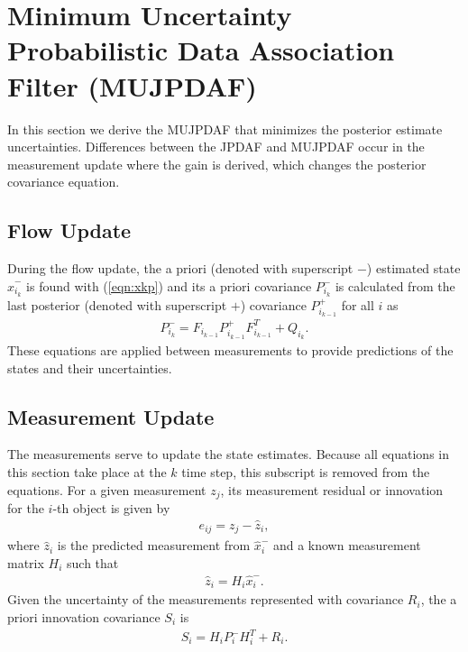 \documentclass[letterpaper, 10pt, conference]{ieeeconf}
\newcommand{\refeqn}[1]{(\ref{eqn:#1})}
\begin{document}
\section{Minimum Uncertainty Probabilistic Data Association Filter (MUJPDAF)}
\label{MUJPDAF}

In this section we derive the MUJPDAF that minimizes the posterior estimate uncertainties.
Differences between the JPDAF and MUJPDAF occur in the measurement update where the gain is derived, which changes the posterior covariance equation.

\subsection{Flow Update}

During the flow update, the a priori (denoted with superscript $-$) estimated state $\hat x_{i_k}^-$ is found with \refeqn{xkp} and its a priori covariance $P_{i_k}^-$ is calculated from the last posterior (denoted with superscript $+$) covariance $P_{i_{k-1}}^+$ for all $i$ as
\begin{gather}
P_{i_{k}}^- = F_{i_{k-1}} P_{i_{k-1}}^+ F_{i_{k-1}}^T + Q_{i_{k}}.
\end{gather}
These equations are applied between measurements to provide predictions of the states and their uncertainties.

\subsection{Measurement Update}

The measurements serve to update the state estimates. Because all equations in this section take place at the $k$ time step, this subscript is removed from the equations. For a given measurement $z_j$, its measurement residual or innovation for the $i$-th object is given by
\begin{align}
e_{ij} = z_j - \hat z_i,\label{eqn:eij}
\end{align}
where $\hat z_i$ is the predicted measurement from $\hat x_{i}^-$ and a known measurement matrix $H_i$ such that
\begin{align}
\hat z_i = H_i\hat x_{i}^-.
\end{align}
Given the uncertainty of the measurements represented with covariance $R_i$, the a priori innovation covariance $S_{i}$ is
\begin{align}
S_{i}=H_{i}P_{i}^{-}H_{i}^T+R_{i}.\label{eqn:S}
\end{align}
\end{document}
